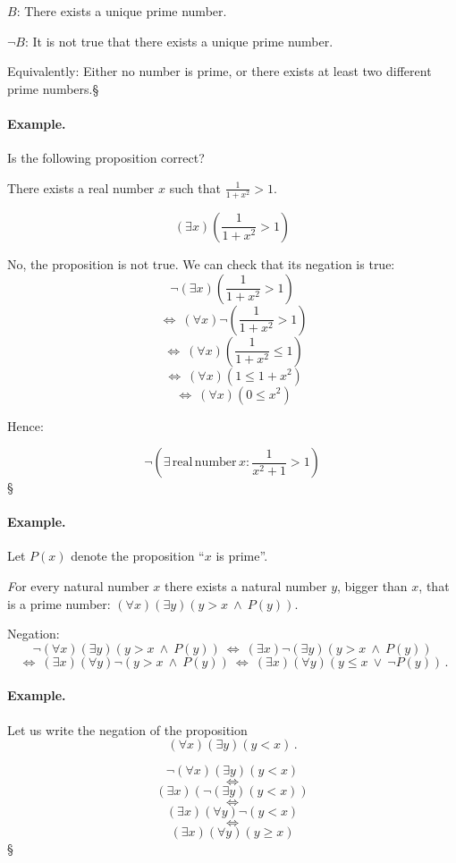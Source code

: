 \documentclass[11pt,paper=b5,footinclude,headinclude]{scrbook} %
\def\ali {{~\vee~}}
\def\inn {{~\wedge~}}
\def\cee {{~\Leftrightarrow~}}
\def\kz{{\hfill{\S}}}%
\theoremstyle{remark}
\theoremstyle{definition} %
\begin{document}
$B$: There exists a unique prime number.

$\neg B$: It is not true that there exists a unique prime number.

Equivalently: Either no number is prime, or there exists at least two different prime numbers.\kz

\bigskip
\paragraph{Example.}

Is the following proposition correct?

There exists a real number $x$ such that $\frac{1}{1+x^2}>1$.

$$(\exists x) (\frac{1}{1+x^2} > 1)$$

No, the proposition is not true. We can check that its negation is true:
$$\neg (\exists x) (\frac{1}{1+x^2} > 1)$$
$$\cee (\forall x) \neg (\frac{1}{1+x^2} > 1)$$
$$\cee (\forall x) (\frac{1}{1+x^2} \le  1)$$
$$\cee (\forall x) (1 \le  1+x^2)$$
$$\cee (\forall x) (0 \le  x^2)$$

Hence:

$$
\neg  \left(
\exists \,\mathrm{ real \, number }\,x: \frac{1}{x^2+1}>1
\right)
$$\kz


\medskip
\paragraph{Example.}

Let $P(x)$ denote the proposition ``$x$ is prime''.

{\emph For every natural number $x$ there exists a natural number $y$, bigger than $x$, that is a prime number:
  $(\forall x)(\exists y)(y>x\inn P(y))$.}

  Negation:   $$\neg (\forall x)(\exists y)(y>x\inn P(y)) \cee(\exists  x)\neg (\exists y)(y>x\inn P(y))$$
  $$\cee(\exists  x)(\forall  y)\neg (y>x\inn P(y))\cee(\exists  x)(\forall  y)(y\le x\ali \neg P(y))\,.$$


\bigskip
\bigskip
\paragraph{Example.}
Let us write the negation of the proposition
  $$(\forall x)(\exists y)(y<x)\,.$$

  $$\neg(\forall x)(\exists y)(y<x)$$
  $$\cee$$
  $$(\exists x)(\neg(\exists y)(y<x))$$
  $$\cee$$
  $$(\exists x)(\forall y)\neg(y<x)$$
  $$\cee$$
  $$(\exists x)(\forall y)(y\ge x)$$\kz
\end{document}
